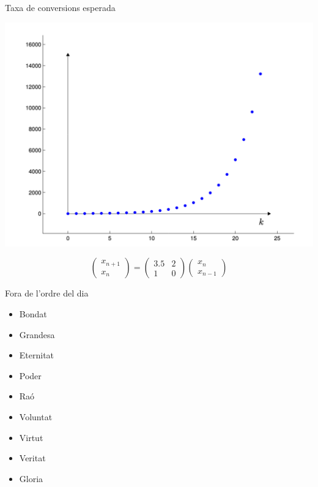 \documentclass{beamer}
\begin{document}
\begin{frame}{Taxa de conversions esperada}

\begin{center}
\includegraphics[scale=.25]{malthus}
\end{center}

\begin{equation}
\begin{pmatrix}x_{n+1} \\ x_n \end{pmatrix} = \begin{pmatrix}
3.5 &2 \\
1 & 0
\end{pmatrix}
\begin{pmatrix}
x_n \\
x_{n-1}
\end{pmatrix}
\end{equation}

\end{frame}

\begin{frame}{Fora de l'ordre del dia}

\begin{itemize}[<+->]
  \item Bondat
  \item Grandesa 
  \item Eternitat
  \item Poder
  \item Raó
  \item Voluntat
  \item Virtut
  \item Veritat
  \item Gloria
\end{itemize}

\end{frame}
\end{document}
